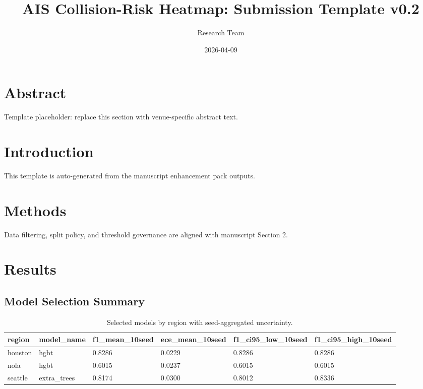 \documentclass[11pt]{article}
\title{AIS Collision-Risk Heatmap: Submission Template v0.2}
\author{Research Team}
\date{2026-04-09}
\begin{document}
\maketitle
\section{Abstract}
Template placeholder: replace this section with venue-specific abstract text.
\section{Introduction}
This template is auto-generated from the manuscript enhancement pack outputs.
\section{Methods}
Data filtering, split policy, and threshold governance are aligned with manuscript Section 2.
\section{Results}
\subsection{Model Selection Summary}
\begin{table}[H]
\centering
\begin{tabular}{llllll}
\hline
region & model\_name & f1\_mean\_10seed & ece\_mean\_10seed & f1\_ci95\_low\_10seed & f1\_ci95\_high\_10seed \\
\hline
houston & hgbt & 0.8286 & 0.0229 & 0.8286 & 0.8286 \\
nola & hgbt & 0.6015 & 0.0237 & 0.6015 & 0.6015 \\
seattle & extra\_trees & 0.8174 & 0.0300 & 0.8012 & 0.8336 \\
\hline
\end{tabular}
\caption{Selected models by region with seed-aggregated uncertainty.}
\end{table}
\end{document}
